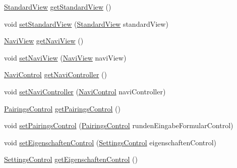 \begin{DoxyCompactItemize}
\hyperlink{classde_1_1turnierverwaltung_1_1view_1_1_standard_view}{Standard\+View} \hyperlink{classde_1_1turnierverwaltung_1_1control_1_1_main_control_a38dbc350e0975b828d79c0fe7b18e7bd}{get\+Standard\+View} ()
\item 
void \hyperlink{classde_1_1turnierverwaltung_1_1control_1_1_main_control_a559e3fc2599c40b4b0c8988e6d655929}{set\+Standard\+View} (\hyperlink{classde_1_1turnierverwaltung_1_1view_1_1_standard_view}{Standard\+View} standard\+View)
\item 
\hyperlink{classde_1_1turnierverwaltung_1_1view_1_1_navi_view}{Navi\+View} \hyperlink{classde_1_1turnierverwaltung_1_1control_1_1_main_control_aca9dc3996bedb2cd2a605312cad7f9a6}{get\+Navi\+View} ()
\item 
void \hyperlink{classde_1_1turnierverwaltung_1_1control_1_1_main_control_a83ed16632477de6bc919aea3b2830db3}{set\+Navi\+View} (\hyperlink{classde_1_1turnierverwaltung_1_1view_1_1_navi_view}{Navi\+View} navi\+View)
\item 
\hyperlink{classde_1_1turnierverwaltung_1_1control_1_1_navi_control}{Navi\+Control} \hyperlink{classde_1_1turnierverwaltung_1_1control_1_1_main_control_aed92350c108778f81c5d36c3bc162dd5}{get\+Navi\+Controller} ()
\item 
void \hyperlink{classde_1_1turnierverwaltung_1_1control_1_1_main_control_a7cf679bdb7b30c06b35446989feccf68}{set\+Navi\+Controller} (\hyperlink{classde_1_1turnierverwaltung_1_1control_1_1_navi_control}{Navi\+Control} navi\+Controller)
\item 
\hyperlink{classde_1_1turnierverwaltung_1_1control_1_1_pairings_control}{Pairings\+Control} \hyperlink{classde_1_1turnierverwaltung_1_1control_1_1_main_control_ae67724fd8b7f813c40a6455d153ea0f4}{get\+Pairings\+Control} ()
\item 
void \hyperlink{classde_1_1turnierverwaltung_1_1control_1_1_main_control_aa8c45084ebef7a116bc2d2dab679392c}{set\+Pairings\+Control} (\hyperlink{classde_1_1turnierverwaltung_1_1control_1_1_pairings_control}{Pairings\+Control} runden\+Eingabe\+Formular\+Control)
\item 
void \hyperlink{classde_1_1turnierverwaltung_1_1control_1_1_main_control_ae24a1cb44872e00abfe660536f0ab134}{set\+Eigenschaften\+Control} (\hyperlink{classde_1_1turnierverwaltung_1_1control_1_1_settings_control}{Settings\+Control} eigenschaften\+Control)
\item 
\hyperlink{classde_1_1turnierverwaltung_1_1control_1_1_settings_control}{Settings\+Control} \hyperlink{classde_1_1turnierverwaltung_1_1control_1_1_main_control_a730a9566e1148bb5efb79b6ccbc50ee2}{get\+Eigenschaften\+Control} ()

\end{DoxyCompactItemize}
